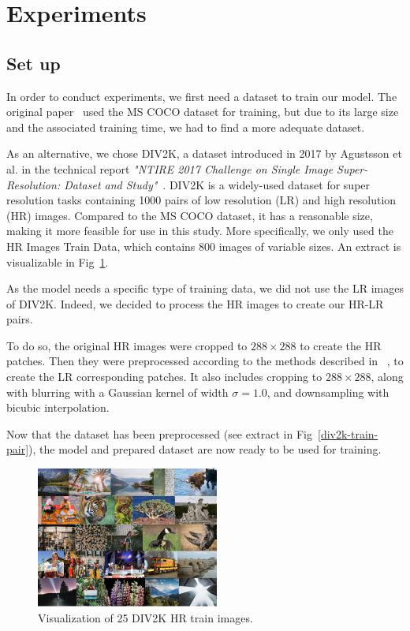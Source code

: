 \documentclass{article}
\begin{document}
{
    \section{Experiments}
    \label{sec:experiments}

        \subsection{Set up}
        \label{subsec:setup}

        In order to conduct experiments, we first need a dataset to train our model. The original paper~\cite{https://doi.org/10.48550/arxiv.1603.08155} used the MS COCO dataset \cite{mscoco} for training, but due to its large size and the associated training time, we had to find a more adequate dataset.
        
        As an alternative, we chose DIV2K, a dataset introduced in 2017 by Agustsson et al. in the technical report \textit{"NTIRE 2017 Challenge on Single Image Super-Resolution: Dataset and Study"}~\cite{div2k-ds}. DIV2K is a widely-used dataset for super resolution tasks containing 1000 pairs of low resolution (LR) and high resolution (HR) images. Compared to the MS COCO dataset, it has a reasonable size, making it more feasible for use in this study. More specifically, we only used the HR Images Train Data, which contains 800 images of variable sizes. An extract is visualizable in Fig~\ref{fig:div2k-train-og}.

        \bigskip

        As the model needs a specific type of training data, we did not use the LR images of DIV2K. Indeed, we decided to process the HR images to create our HR-LR pairs. %

        To do so, the original HR images were cropped to $288 \times 288$ to create the HR patches. Then they were preprocessed according to the methods described in ~\cite{https://doi.org/10.48550/arxiv.1603.08155}, to create the LR corresponding patches. It also includes cropping to $288 \times 288$, along with blurring with a Gaussian kernel of width $\sigma = 1.0$, and downsampling with bicubic interpolation.
        
        Now that the dataset has been preprocessed (see extract in Fig~\ref{div2k-train-pair}), the model and prepared dataset are now ready to be used for training.

        \begin{figure}[ht]
            \centering
            \includegraphics[width=6cm]{images/DIV2K_HR.png}
            \caption{Visualization of 25 DIV2K HR train images.}
            \label{fig:div2k-train-og}
        \end{figure}

}
\end{document}

